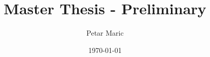 \documentclass[11pt,a4paper,english]{article} %
\title{Master Thesis - Preliminary } %
\author{Petar Maric}%
\date{\today} %
\begin{document}
\maketitle
\newpage
\tableofcontents
\newpage
\begin{comment}
HAUPTFORSCHUNGSGRAGE
Wie kann Künstlichen Intelligenz - zur Steigerung der Effizienz des Interior-Engineerings in der Unikatfertigung von VIP-Flugzeugkabinensystemen bei der Lufthansa Technik AG beitragen?

TEILFORSCHUNGSFRAGEN
2. Welche Automatisierungs-/Optimierungspotentiale können im Entwicklungsprozess von Interior Bauteilen mittels K.I. realisiert werden?
3. Welche K.I.-Technologie ist prädestiniert für die Ausschöpfung eines oder aller identifizierten Potentiale?
4. Wie könnte eine prototypische Entwicklung einer K.I. – Anwendung als Lösungskonzept in einer ver-
einfachten Prozessumgebung aussehen? 5. Welchen Effekt hat das K.I. gestützte Lösungskonzept auf die Effizienz im Entwicklungsprozess von
Interieur-Bauteilen?

$$$$$$$$______FORMALE ANFORDERUNGEN_________$$$$$$$
Master Thesis:          60 Seiten
Schriftart:             New Times Roman 12pt
                        Arail 11pt
                        Abbildungen & Tabellen 11pt
                        Fußnoten 10pt.

Zeilenabstand:          Text 1.5
                        Fußnote 1.0

Absatzformat:           Blocksatz

Nummerierung:           rechts Unten
                        Titelblatt keine Nummerierung
                        Text mit 1 beginnend (arab)
                        Verzeichnisse vor dem Text mit I (röm) - Inhalt, Abkürzung, Abb, Tabellen
                        Verzeichnisse nach dem Text fortl. (arab)
                        Verzeichnisse keine Überschriftnummer

$$$$$$$$______LITERATUR AUSWAHL_________$$$$$$$
Anzahl Quellen:         min: 1 pro Seite (unterschiedlich)
Sprache:                min 50%
Herkunft:               Wiss. Artikel in Journal min 30%
                        Internet max 10%
                        Monographien (Lehr- und Praktikerbücher) - rest

Literaturverz.:         Aplhabetisch - Chronologisch sortiert

$$$$$$$$______ABBILDUNGEN & TABELLEN_________$$$$$$$
Quellenangabe:          Bei jeder Tabelle und Abbildung
                        "Quelle: " muss führend davor stehen (Abbildung unten, Tabelle oben)
                        Eigene Darstellung: "Quelle: Eigenen Darstellung in Anlehung an"
\end{comment}
\end{document}
